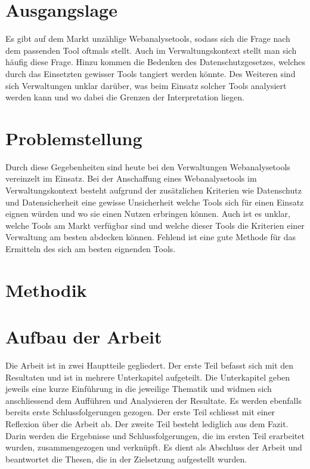 
\section{Ausgangslage}
Es gibt auf dem Markt unzählige Webanalysetools, sodass sich die Frage nach dem passenden Tool oftmals stellt. Auch im Verwaltungskontext stellt man sich häufig diese Frage. Hinzu kommen die Bedenken des Datenschutzgesetzes, welches durch das Einsetzten gewisser Tools tangiert werden könnte. Des Weiteren sind sich Verwaltungen unklar darüber, was beim Einsatz solcher Tools analysiert werden kann und wo dabei die Grenzen der Interpretation liegen.

\section{Problemstellung}

Durch diese Gegebenheiten sind heute bei den Verwaltungen Webanalysetools vereinzelt im Einsatz. Bei der Anschaffung eines Webanalysetools im Verwaltungskontext besteht aufgrund der zusätzlichen Kriterien wie Datenschutz und Datensicherheit eine gewisse Unsicherheit welche Tools sich für einen Einsatz eignen würden und wo sie einen Nutzen erbringen können. Auch ist es unklar, welche Tools am Markt verfügbar sind und welche dieser Tools die Kriterien einer Verwaltung am besten abdecken können. Fehlend ist eine gute Methode für das Ermitteln des sich am besten eignenden Tools.

\section{Methodik}


\section{Aufbau der Arbeit}

Die Arbeit ist in zwei Hauptteile gegliedert. 
Der erste Teil befasst sich mit den Resultaten und ist in mehrere Unterkapitel aufgeteilt. Die Unterkapitel geben jeweils eine kurze Einführung in die jeweilige Thematik und widmen sich anschliessend dem Aufführen und Analysieren der Resultate. Es werden ebenfalls bereits erste Schlussfolgerungen gezogen. Der erste Teil schliesst mit einer Reflexion über die Arbeit ab. 
Der zweite Teil besteht lediglich aus dem Fazit. Darin werden die Ergebnisse und Schlussfolgerungen, die im ersten Teil erarbeitet wurden, zusammengezogen und verknüpft. Es dient als Abschluss der Arbeit und beantwortet die Thesen, die in der Zielsetzung aufgestellt wurden. 